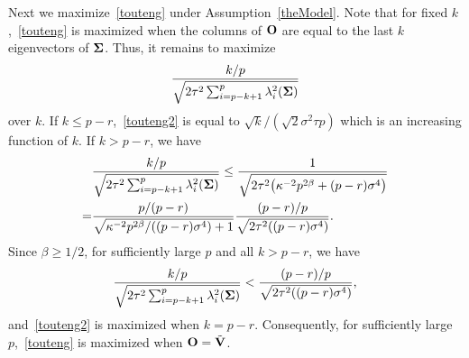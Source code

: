 \documentclass[times,sort&compress,3p]{elsarticle}
\theoremstyle{plain}
\theoremstyle{definition}
\theoremstyle{remark}
\begin{document}
Next we maximize~\eqref{touteng} under Assumption~\ref{theModel}. Note that for fixed $k$,~\eqref{touteng} is maximized when the columns of $\mathbf{O}$ are equal to the last $k$ eigenvectors of $\boldsymbol{\Sigma}$.
Thus, it remains to maximize
\begin{equation}\label{touteng2}
\frac{k/p}{\sqrt{2\tau^2\sum_{i=p-k+1}^p \lambda_i^2 (\boldsymbol{\Sigma})}}
\end{equation}
over $k$.
If $k\leq p-r$,~\eqref{touteng2} is equal to $\sqrt{k}/(\sqrt{2} \sigma^2 \tau p)$ which is an increasing function of $k$.
If $k> p-r$, we have
\begin{equation*}
    \begin{aligned}
        &\frac{k/p}{\sqrt{2\tau^2\sum_{i=p-k+1}^p \lambda_i^2(\boldsymbol{\Sigma})}}
        \leq
        \frac{1}{\sqrt{2\tau^2\big(\kappa^{-2}p^{2\beta}+(p-r)\sigma^4\big)}}\\
        =&
        \frac{p/(p-r)}{\sqrt{\kappa^{-2}p^{2\beta}/((p-r)\sigma^4)+1}}
\frac{(p-r)/p}{\sqrt{2\tau^2((p-r)\sigma^4)}}.
    \end{aligned}
\end{equation*}
Since $\beta\geq 1/2$, for sufficiently large $p$ and all $k>p-r$, we have
\begin{equation*}
    \begin{aligned}
        \frac{k/p}{\sqrt{2\tau^2\sum_{i=p-k+1}^p \lambda_i^2(\boldsymbol{\Sigma})}}
        <
\frac{(p-r)/p}{\sqrt{2\tau^2((p-r)\sigma^4)}},
    \end{aligned}
\end{equation*}
and~\eqref{touteng2} is maximized when $k=p-r$.
Consequently, for sufficiently large $p$,~\eqref{touteng} is maximized when $\mathbf{O}=\tilde{\mathbf{V}}$.
\end{document}
